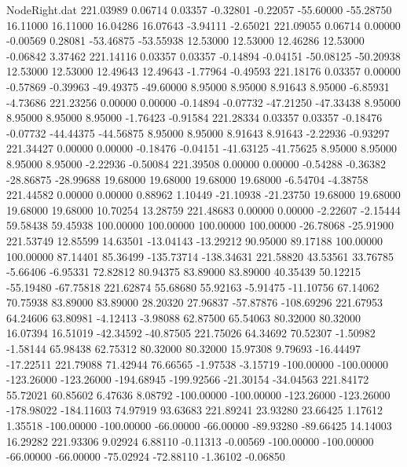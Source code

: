 \begin{filecontents}{NodeRight.dat}
 221.03989    0.06714    0.03357    -0.32801   -0.22057  -55.60000  -55.28750   16.11000   16.11000   16.04286   16.07643   -3.94111   -2.65021
 221.09055    0.06714    0.00000    -0.00569    0.28081  -53.46875  -53.55938   12.53000   12.53000   12.46286   12.53000   -0.06842    3.37462
 221.14116    0.03357    0.03357    -0.14894   -0.04151  -50.08125  -50.20938   12.53000   12.53000   12.49643   12.49643   -1.77964   -0.49593
 221.18176    0.03357    0.00000    -0.57869   -0.39963  -49.49375  -49.60000    8.95000    8.95000    8.91643    8.95000   -6.85931   -4.73686
 221.23256    0.00000    0.00000    -0.14894   -0.07732  -47.21250  -47.33438    8.95000    8.95000    8.95000    8.95000   -1.76423   -0.91584
 221.28334    0.03357    0.03357    -0.18476   -0.07732  -44.44375  -44.56875    8.95000    8.95000    8.91643    8.91643   -2.22936   -0.93297
 221.34427    0.00000    0.00000    -0.18476   -0.04151  -41.63125  -41.75625    8.95000    8.95000    8.95000    8.95000   -2.22936   -0.50084
 221.39508    0.00000    0.00000    -0.54288   -0.36382  -28.86875  -28.99688   19.68000   19.68000   19.68000   19.68000   -6.54704   -4.38758
 221.44582    0.00000    0.00000     0.88962    1.10449  -21.10938  -21.23750   19.68000   19.68000   19.68000   19.68000   10.70254   13.28759
 221.48683    0.00000    0.00000    -2.22607   -2.15444   59.58438   59.45938  100.00000  100.00000  100.00000  100.00000  -26.78068  -25.91900
 221.53749   12.85599   14.63501   -13.04143  -13.29212   90.95000   89.17188  100.00000  100.00000   87.14401   85.36499 -135.73714 -138.34631
 221.58820   43.53561   33.76785    -5.66406   -6.95331   72.82812   80.94375   83.89000   83.89000   40.35439   50.12215  -55.19480  -67.75818
 221.62874   55.68680   55.92163    -5.91475  -11.10756   67.14062   70.75938   83.89000   83.89000   28.20320   27.96837  -57.87876 -108.69296
 221.67953   64.24606   63.80981    -4.12413   -3.98088   62.87500   65.54063   80.32000   80.32000   16.07394   16.51019  -42.34592  -40.87505
 221.75026   64.34692   70.52307    -1.50982   -1.58144   65.98438   62.75312   80.32000   80.32000   15.97308    9.79693  -16.44497  -17.22511
 221.79088   71.42944   76.66565    -1.97538   -3.15719 -100.00000 -100.00000 -123.26000 -123.26000 -194.68945 -199.92566  -21.30154  -34.04563
 221.84172   55.72021   60.85602     6.47636    8.08792 -100.00000 -100.00000 -123.26000 -123.26000 -178.98022 -184.11603   74.97919   93.63683
 221.89241   23.93280   23.66425     1.17612    1.35518 -100.00000 -100.00000  -66.00000  -66.00000  -89.93280  -89.66425   14.14003   16.29282
 221.93306    9.02924    6.88110    -0.11313   -0.00569 -100.00000 -100.00000  -66.00000  -66.00000  -75.02924  -72.88110   -1.36102   -0.06850

\end{filecontents}
